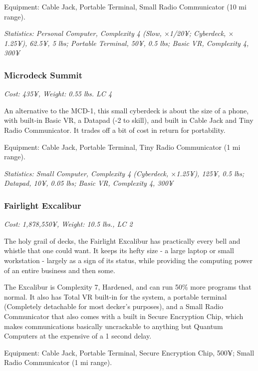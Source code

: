 \begin{multicols}{3}
	Equipment: Cable Jack, Portable Terminal, Small Radio Communicator (10 mi range).
	
	\textit{\textcolor{OliveGreen}{Statistics: Personal Computer, Complexity 4 (Slow, \(\times\)1/20¥; Cyberdeck, \(\times\)1.25¥), 62.5¥, 5 lbs; Portable Terminal, 50¥, 0.5 lbs; Basic VR, Complexity 4, 300¥}}
	
	\subsubsection*{Microdeck Summit}
	
	\textit{\textcolor{NavyBlue}{Cost: 435¥, Weight: 0.55 lbs. LC 4}}
	
	An alternative to the MCD-1, this small cyberdeck is about the size of a phone, with built-in Basic VR, a Datapad (-2 to skill), and built in Cable Jack and Tiny Radio Communicator. It trades off a bit of cost in return for portability.
	
	Equipment: Cable Jack, Portable Terminal, Tiny Radio Communicator (1 mi range).
	
	\textit{\textcolor{OliveGreen}{Statistics: Small Computer, Complexity 4 (Cyberdeck, \(\times\)1.25¥), 125¥, 0.5 lbs; Datapad, 10¥, 0.05 lbs; Basic VR, Complexity 4, 300¥}}
	
	\subsubsection*{Fairlight Excalibur}
	
	\textit{\textcolor{NavyBlue}{Cost: 1,878,550¥, Weight: 10.5 lbs., LC 2}}
	
	The holy grail of decks, the Fairlight Excalibur has practically every bell and whistle that one could want. It keeps its hefty size - a large laptop or small workstation - largely as a sign of its status, while providing the computing power of an entire business and then some.
	
	The Excalibur is Complexity 7, Hardened, and can run 50\% more programs that normal. It also has Total VR built-in for the system, a portable terminal (Completely detachable for most decker's purposes), and a Small Radio Communicator that also comes with a built in Secure Encryption Chip, which makes communications basically uncrackable to anything but Quantum Computers at the expensive of a 1 second delay.
	
	Equipment: Cable Jack, Portable Terminal, Secure Encryption Chip, 500¥; Small Radio Communicator (1 mi range).
	

\end{multicols}
